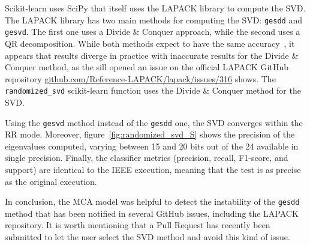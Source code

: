 \documentclass[11pt]{article}
\begin{document}
Scikit-learn uses SciPy that itself uses the LAPACK library to compute the SVD. The LAPACK library has two main methods for computing the SVD: 
\texttt{gesdd} and \texttt{gesvd}. The first one uses a Divide \& Conquer approach, while the second uses a QR decomposition. While both methods expect to have the same accuracy~\cite{nakatsukasa2013stable}, it appears that results diverge in practice with inaccurate results for the Divide \& Conquer method, as the sill opened an issue on the official LAPACK GitHub repository \href{https://github.com/Reference-LAPACK/lapack/issues/316}{github.com/Reference-LAPACK/lapack/issues/316} shows. The \texttt{randomized\_svd} scikit-learn function uses the Divide \& Conquer method for the SVD. 

Using the  \texttt{gesvd} method instead of the \texttt{gesdd} one, the SVD converges within the RR mode.
Moreover, figure~\ref{fig:randomized_svd_S} shows the precision of the eigenvalues computed, varying between 15 and 20 bits out of the 24 available in single precision. Finally, the classifier metrics (precision, recall, F1-score, and support) are identical to the IEEE execution, meaning that the test is as precise as the original execution.

In conclusion, the MCA model was helpful to detect the instability of the \texttt{gesdd} method that has been notified in several GitHub issues, including the LAPACK repository. It is worth mentioning that a Pull Request has recently been submitted to let the user select the SVD method and avoid this kind of issue.
\end{document}
